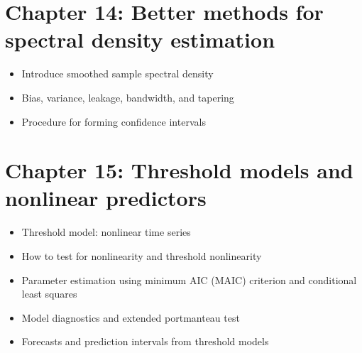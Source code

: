 \documentclass[12pt]{article}
\begin{document}
\section*{Chapter 14: Better methods for spectral density estimation}
\label{sec-14}

\begin{itemize}
\item Introduce smoothed sample spectral density
\item Bias, variance, leakage, bandwidth, and tapering
\item Procedure for forming confidence intervals
\end{itemize}
\section*{Chapter 15: Threshold models and nonlinear predictors}
\label{sec-15}

\begin{itemize}
\item Threshold model: nonlinear time series
\item How to test for nonlinearity and threshold nonlinearity
\item Parameter estimation using minimum AIC (MAIC) criterion and conditional least squares
\item Model diagnostics and extended portmanteau test
\item Forecasts and prediction intervals from threshold models
\end{itemize}



  
\end{document}
